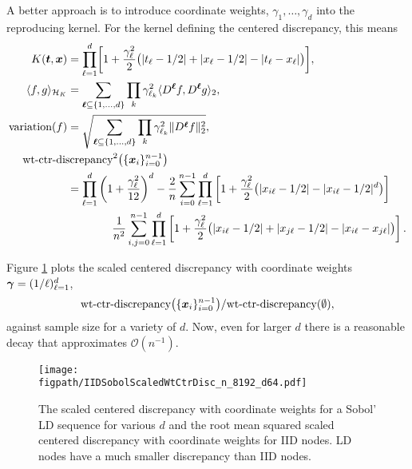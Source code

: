 \documentclass{svproc}
\newcommand{\figpath}{Figures}
\begin{document}
A better approach is to introduce coordinate weights, $\gamma_1, \ldots, \gamma_d$ into the reproducing kernel.  For the kernel defining the centered discrepancy, this means
\begin{align} \label{eq:wtctrkernel}
	K(\bst,\bsx) &= \prod_{\ell = 1}^d \biggl [ 1 + \frac {\gamma_\ell^2}2 \bigl ( \lvert t_\ell - 1/2 \rvert + \lvert x_\ell - 1/2 \rvert - \lvert t_\ell - x_\ell \rvert \bigr ) \biggr] , \\
	\langle f, g \rangle_{\calH_K}  &= \sum_{\bsell \subseteq \{1, \ldots, d\}} \prod_k \gamma_{\ell_k}^2 \langle D^{\bsell}f, D^{\bsell}g \rangle_2, \\
	\text{variation}(f)  &= \sqrt{\sum_{\bsell \subseteq \{1, \ldots, d\}} \prod_k \gamma_{\ell_k}^2 \lVert D^{\bsell}f \rVert_2^2}, \\
	\label{eq:wt-ctrdisc}
	\nonumber
	\MoveEqLeft[4]\text{wt-ctr-discrepancy}^2\bigl(\{ \bsx_i\}_{i=0}^{n-1} \bigr) \\
	\nonumber
	&= \prod_{\ell=1}^d \left ( 1 + \frac{\gamma_{\ell}^2}{12} \right )^d
	- \frac 2n \sum_{i=0}^{n-1} \prod_{\ell=1}^d \left [ 1 + \frac {\gamma_{\ell}^2}2 \bigl ( \lvert x_{i\ell} - 1/2 \rvert - \lvert x_{i\ell} - 1/2 \rvert^d \bigr )\right ] \\
	& \qquad \qquad \frac{1}{n^2} \sum_{i,j=0}^{n-1} \prod_{\ell = 1}^d \left[ 1 + \frac {\gamma_{\ell}^2}2 \bigl ( \lvert x_{i\ell} - 1/2 \rvert + \lvert x_{j\ell} - 1/2 \rvert - \lvert x_{i\ell} - x_{j\ell} \rvert \bigr ) \right].
\end{align}

Figure \ref{fig:scaledweightedcentered} plots the scaled centered discrepancy with coordinate weights ${\boldsymbol{\gamma}} = (1/\ell)_{\ell =1}^d$,
\begin{equation*}
    \text{wt-ctr-discrepancy}\bigl(\{ {\boldsymbol{x}}_i\}_{i=0}^{n-1} \bigr)/\text{wt-ctr-discrepancy}(\emptyset ),
\end{equation*}
against sample size for a variety of $d$.  Now, even for larger $d$ there is a reasonable decay that approximates $\mathcal{O}(n^{-1})$.

\begin{figure}
    \centering
    \texttt{[image: \\figpath/IIDSobolScaledWtCtrDisc\_n\_8192\_d64.pdf]}
    \caption{The scaled centered discrepancy with coordinate weights for a Sobol' LD sequence for various $d$ and the root mean squared scaled centered discrepancy with coordinate weights for IID nodes.  LD nodes have a much smaller discrepancy than IID nodes.}
    \label{fig:scaledweightedcentered}
\end{figure}
\end{document}
